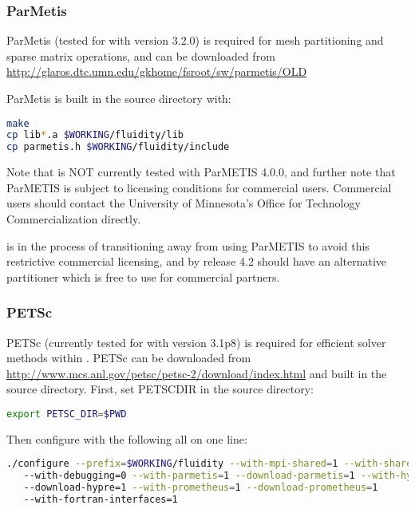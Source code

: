 \subsubsection{ParMetis}
\label{sec:required_libraries_numerical_parmetis}

ParMetis (tested for \fluidity with version 3.2.0) is required for mesh
partitioning and sparse matrix operations, and can be downloaded from
\url{http://glaros.dtc.umn.edu/gkhome/fsroot/sw/parmetis/OLD}

ParMetis is built in the source directory with:

\begin{lstlisting}[language=bash]
make
cp lib*.a $WORKING/fluidity/lib
cp parmetis.h $WORKING/fluidity/include
\end{lstlisting}

Note that \fluidity is NOT currently tested with ParMETIS 4.0.0, and further
note that ParMETIS is subject to licensing conditions for commercial users.
Commercial users should contact the University of Minnesota's Office for
Technology Commercialization directly. 

\fluidity is in the process of transitioning away from using ParMETIS to avoid
this restrictive commercial licensing, and by release 4.2 should have an
alternative partitioner which is free to use for commercial partners.

\subsubsection{PETSc}
\label{sec:required_libraries_numerical_petsc}

PETSc (currently tested for \fluidity with version 3.1p8) is required for
efficient solver methods within \fluidity. PETSc can be downloaded from
\url{http://www.mcs.anl.gov/petsc/petsc-2/download/index.html} and built in the
source directory. First, set PETSC{\textunderscore}DIR in the source directory:

\begin{lstlisting}[language=bash]
export PETSC_DIR=$PWD
\end{lstlisting}

Then configure with the following all on one line:

\begin{lstlisting}[language=bash]
./configure --prefix=$WORKING/fluidity --with-mpi-shared=1 --with-shared=1
   --with-debugging=0 --with-parmetis=1 --download-parmetis=1 --with-hypre=1
   --download-hypre=1 --with-prometheus=1 --download-prometheus=1
   --with-fortran-interfaces=1
\end{lstlisting}

